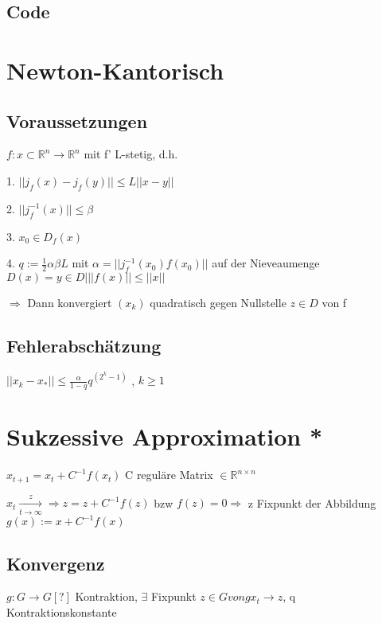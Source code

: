 \documentclass[12pt,a4paper]{article} %
\newcommand*\tab[1][1cm]{\hspace*{#1}}
\begin{document}
	\subsection{Code}
	
	\newpage
	
	\section{Newton-Kantorisch}
	
	\subsection{Voraussetzungen}
	
	$f: x \subset \mathbb{R}^n \rightarrow \mathbb{R}^n$ mit f' L-stetig, d.h.
	
	1. $|| j_f(x) - j_f(y)|| \le L||x - y||$
	
	2. $||j_f^{-1}(x)|| \le \beta$
	
	3. $x_0 \in D_f(x)$
	
	4. $q := \frac{1}{2} \alpha \beta L$ mit $\alpha = ||j_f^{-1}(x_0)f(x_0)||$ auf der Nieveaumenge $D(x) = {y \in D | ||f(x) || \le ||x||}$
	
	$\Rightarrow$ Dann konvergiert $(x_k)$ quadratisch gegen Nullstelle $z \in D$ von f
	
	\subsection{Fehlerabschätzung}
	
	$||x_k - x_*|| \le \frac{\alpha}{1 - q}q^{(2^k - 1)}$ \tab , $k \ge 1$
	
	\newpage
	
	\section{Sukzessive Approximation *}
	
	$x_{t + 1} = x_t + C^{-1} f(x_t)$ \tab C reguläre Matrix $\in \mathbb{R}^{n \times n}$
	
	$x_t \xrightarrow[t \rightarrow \infty] z \Rightarrow z = z + C^{-1}f(z)$ bzw $f(z) = 0 \Rightarrow$ z Fixpunkt der Abbildung $g(x) := x + C^{-1}f(x)$
	
	\subsection{Konvergenz}
	
	$g: G \rightarrow G[?]$ Kontraktion, $\exists$ Fixpunkt $z \in G von g x_t \rightarrow z$, q Kontraktionskonstante
	
\end{document}
